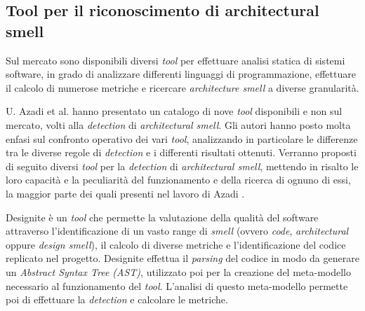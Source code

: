 \subsection{Tool per il riconoscimento di architectural smell}

Sul mercato sono disponibili diversi \textit{tool} per effettuare analisi statica di sistemi software, in grado di analizzare differenti linguaggi di programmazione, effettuare il calcolo di numerose metriche e ricercare \textit{architecture smell} a diverse granularità.

U. Azadi et al. \cite{AzadiFontana} hanno presentato un catalogo di nove \textit{tool} disponibili e non sul mercato, volti alla \textit{detection} di \textit{architectural smell}. Gli autori hanno posto molta enfasi sul confronto operativo dei vari \textit{tool}, analizzando in particolare le differenze tra le diverse regole di \textit{detection} e i differenti risultati ottenuti. 
Verranno proposti di seguito diversi \textit{tool} per la \textit{detection} di \textit{architectural smell}, mettendo in risalto le loro capacità e la peculiarità del funzionamento e della ricerca di ognuno di essi, la maggior parte dei quali presenti nel lavoro di Azadi \cite{AzadiFontana}.

    Designite \cite{Designite} è un \textit{tool} che permette la valutazione della qualità del software attraverso l'identificazione di un vasto range di \textit{smell} (ovvero \textit{code}, \textit{architectural} oppure \textit{design smell}), il calcolo di diverse metriche e l'identificazione del codice replicato nel progetto. %
    Designite effettua il \textit{parsing} del codice in modo da generare un \textit{Abstract Syntax Tree (AST)}, utilizzato poi per la creazione del meta-modello necessario al funzionamento del \textit{tool}. L'analisi di questo meta-modello permette poi di effettuare la \textit{detection} e calcolare le metriche.


